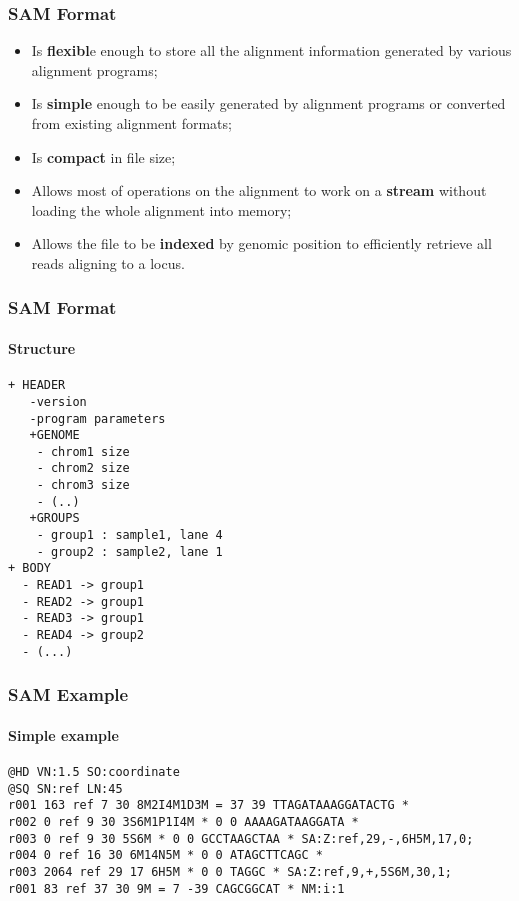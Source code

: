\documentclass[xcolor=table]{beamer}
\begin{document}
\begin{frame}[fragile]
\frametitle{SAM Format}
\begin{itemize}
\item Is \textbf{flexibl}e enough to store all the alignment information generated by various alignment programs;
\item Is \textbf{simple} enough to be easily generated by alignment programs or converted from existing alignment formats;
\item Is \textbf{compact} in file size;
\item Allows most of operations on the alignment to work on a \textbf{stream} without loading the whole alignment into memory;
\item Allows the file to be \textbf{indexed} by genomic position to efficiently retrieve all reads aligning to a locus. 
\end{itemize}
\end{frame}



\begin{frame}[fragile]
\frametitle{SAM Format}
\framesubtitle{Structure}
\begin{verbatim}
+ HEADER
   -version
   -program parameters
   +GENOME
   	- chrom1 size
   	- chrom2 size
   	- chrom3 size
   	- (..)
   +GROUPS
   	- group1 : sample1, lane 4
   	- group2 : sample2, lane 1
+ BODY
  - READ1 -> group1
  - READ2 -> group1
  - READ3 -> group1
  - READ4 -> group2
  - (...)
\end{verbatim}
\end{frame}




\begin{frame}[fragile]
\frametitle{SAM Example}
\framesubtitle{Simple example}
\begin{framed}\tiny
\begin{verbatim}
@HD VN:1.5 SO:coordinate
@SQ SN:ref LN:45
r001 163 ref 7 30 8M2I4M1D3M = 37 39 TTAGATAAAGGATACTG *
r002 0 ref 9 30 3S6M1P1I4M * 0 0 AAAAGATAAGGATA *
r003 0 ref 9 30 5S6M * 0 0 GCCTAAGCTAA * SA:Z:ref,29,-,6H5M,17,0;
r004 0 ref 16 30 6M14N5M * 0 0 ATAGCTTCAGC *
r003 2064 ref 29 17 6H5M * 0 0 TAGGC * SA:Z:ref,9,+,5S6M,30,1;
r001 83 ref 37 30 9M = 7 -39 CAGCGGCAT * NM:i:1
\end{verbatim}
\end{framed}
\end{frame}
\end{document}
